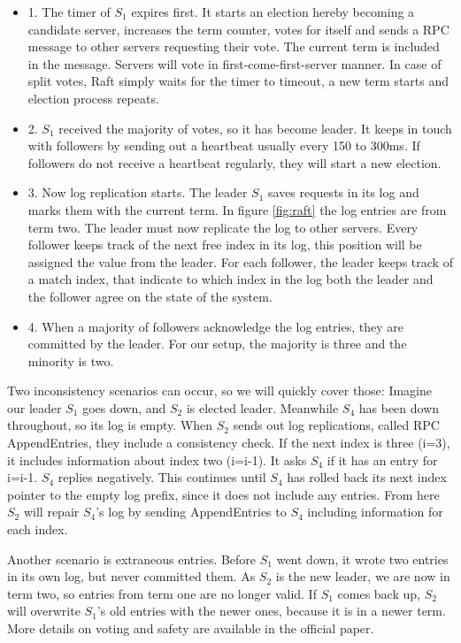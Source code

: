 \begin{itemize}
	\item 1. The timer of $S_1$ expires first. It starts an election hereby becoming a candidate server, increases the term counter, votes for itself and sends a RPC message to other servers requesting their vote. The current term is included in the message. Servers will vote in  first-come-first-server manner. In case of split votes, Raft simply waits for the timer to timeout, a new term starts and election process repeats.
	\item 2. $S_1$ received the majority of votes, so it has become leader. It keeps in touch with followers by sending out a heartbeat usually every 150 to 300ms. If followers do not receive a heartbeat regularly, they will start a new election.
	\item 3. Now log replication starts. The leader $S_1$ saves requests in its log and marks them with the current term. In figure \ref{fig:raft} the log entries are from term two. The leader must now replicate the log to other servers. Every follower keeps track of the next free index in its log, this position will be assigned the value from the leader. For each follower, the leader keeps track of a match index, that indicate to which index in the log both the leader and the follower agree on the state of the system.
	\item 4. When a majority of followers acknowledge the log entries, they are committed by the leader. For our setup, the majority is three and the minority is two.
\end{itemize}

\noindent Two inconsistency scenarios can occur, so we will quickly cover those: Imagine our leader $S_1$ goes down, and $S_2$ is elected leader. Meanwhile $S_4$ has been down throughout, so its log is empty. When $S_2$ sends out log replications, called RPC AppendEntries, they include a consistency check. If the next index is three (i=3), it includes information about index two (i=i-1). It asks $S_4$ if it has an entry for i=i-1. $S_4$ replies negatively. This continues until $S_4$ has rolled back its next index pointer to the empty log prefix, since it does not include any entries. From here $S_2$ will repair $S_4$'s log by sending AppendEntries to $S_4$ including information for each index.

\noindent Another scenario is extraneous entries. Before $S_1$ went down, it wrote two entries in its own log, but never committed them. As $S_2$ is the new leader, we are now in term two, so entries from term one are no longer valid. If $S_1$ comes back up, $S_2$ will overwrite $S_1$'s old entries with the newer ones, because it is in a newer term. More details on voting and safety are available in the official paper.

